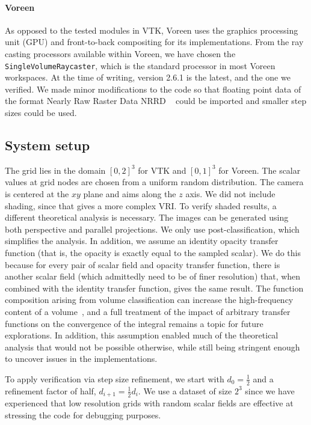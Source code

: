 \paragraph*{Voreen} 
As opposed to the tested modules in VTK, Voreen uses the graphics
processing unit (GPU) and front-to-back compositing for its
implementations. From the ray casting processors available within
Voreen, we have chosen the \texttt{SingleVolumeRaycaster}, which is
the standard processor in most Voreen workspaces. At the time of
writing, version 2.6.1 is the latest, and the one we verified. We made
minor modifications to the code so that floating point data of the
format Nearly Raw Raster Data NRRD ~\cite{teem} could be imported and
smaller step sizes could be used.

\subsection{System setup}

The grid lies in the domain $[0, 2]^3$ for VTK and $[0, 1]^3$ for
Voreen. The scalar values at grid nodes are chosen from a uniform
random distribution. The camera is centered at the $xy$ plane and aims
along the $z$ axis. We did not include shading, since that gives a
more complex VRI. To verify shaded results, a different
theoretical analysis is necessary.  The images can be generated using
both perspective and parallel projections. We only use
post-classification, which simplifies the analysis. In addition, we
assume an identity opacity transfer function (that is, the opacity is
exactly equal to the sampled scalar). We do this
because for every pair of scalar field and opacity transfer function,
there is another scalar field (which admittedly need to be of
finer resolution) that, when combined with the identity
transfer function, gives the same result.
%
The function composition arising from volume classification 
can increase the high-frequency content of a
volume~\cite{Bergner:2006:ASA}, and a full treatment of the impact of
arbitrary transfer functions on the convergence of the integral
remains a topic for future explorations. In addition, this assumption
enabled much of the theoretical analysis that would not be 
possible otherwise, while still being stringent enough to uncover
issues in the implementations.

To apply verification via step size refinement, we start with $d_0 =
\frac{1}{2}$ and a refinement factor of half, $d_{i+1} = \frac{1}{2}
d_i$. We use a dataset of size $2^3$ since we have experienced that
low resolution grids with random scalar fields are effective at
stressing the code for debugging purposes.

